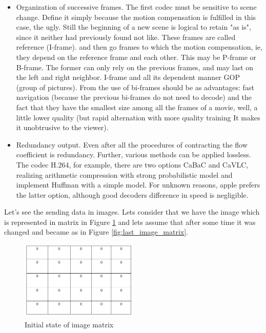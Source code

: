\begin{itemize}
\item Organization of successive frames. The first codec must be sensitive to scene change. Define it simply because the motion compensation is fulfilled in this case, the ugly. Still the beginning of a new scene is logical to retain "as is", since it neither had previously found not like. These frames are called reference (I-frame). and then go frames to which the motion compensation, ie, they depend on the reference frame and each other. This may be P-frame or B-frame. The former can only rely on the previous frames, and may last on the left and right neighbor. I-frame and all its dependent manner GOP (group of pictures). From the use of bi-frames should be as advantages: fast navigation (because the previous bi-frames do not need to decode) and the fact that they have the smallest size among all the frames of a movie, well, a little lower quality (but rapid alternation with more quality training It makes it unobtrusive to the viewer).

\item Redundancy output. Even after all the procedures of contracting the flow coefficient is redundancy. Further, various methods can be applied lossless. The codec H.264, for example, there are two options CaBaC and CaVLC, realizing arithmetic compression with strong probabilistic model and implement Huffman with a simple model. For unknown reasons, apple prefers the latter option, although good decoders difference in speed is negligible.


\end{itemize}



Let’s see the sending data in images. Lets consider that we have the image which is represented in matrix in Figure \ref{fig:example_matrix} and lets assume that after some time it was changed and became as in Figure \ref{fig:last_image_matrix}.

\begin{figure}[h]
    \centering
    \includegraphics[width=0.5\textwidth, height=0.35\textwidth]{Figures/example_matrix}
    \caption{Initial state of image matrix}
    \label{fig:example_matrix}
\end{figure}


